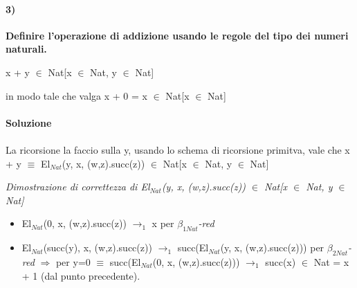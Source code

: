 \paragraph{3)}
\textbf{Definire l'operazione di addizione usando le regole del tipo dei numeri naturali.}
\begin{center} x + y $\in$ Nat[x $\in$ Nat, y $\in$ Nat]\end{center}
in modo tale che valga x + 0 = x $\in$  Nat[x $\in$ Nat]
\\\\
\textbf{Soluzione}\\\\
La ricorsione la faccio sulla y, usando lo schema di ricorsione primitva, vale che x + y $\equiv$ El$_{Nat}$(y, x, (w,z).succ(z)) $\in$ Nat[x $\in$ Nat, y $\in$ Nat]


\scriptsize
\begin{adjustwidth}{-16em}{}
\begin{prooftree}
\end{prooftree}
\end{adjustwidth}
\noindent
\normalsize \textit{Dimostrazione di correttezza di El$_{Nat}$(y, x, (w,z).succ(z)) $\in$ Nat[x $\in$ Nat, y $\in$ Nat]}
\begin{itemize}
\item El$_{Nat}$(0, x, (w,z).succ(z))  $\rightarrow_1$ x per \textit{$\beta_{1Nat}$-red}
\item El$_{Nat}$(succ(y), x, (w,z).succ(z)) $\rightarrow_1$ succ(El$_{Nat}$(y, x, (w,z).succ(z))) per \textit{$\beta_{2Nat}$-red} $\Rightarrow$ per y=0 $\equiv$ succ(El$_{Nat}$(0, x, (w,z).succ(z))) $\rightarrow_1$ succ(x) $\in$ Nat = x + 1  (dal punto precedente).
\end{itemize}

